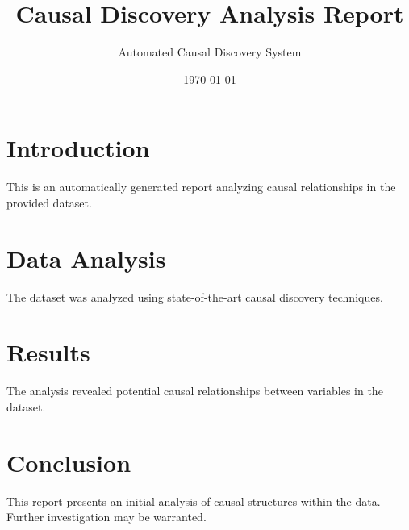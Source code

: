 \documentclass[10pt]{article}
\title{Causal Discovery Analysis Report}
\author{Automated Causal Discovery System}
\date{\today}
\begin{document}
\maketitle

\section{Introduction}
This is an automatically generated report analyzing causal relationships in the provided dataset.

\section{Data Analysis}
The dataset was analyzed using state-of-the-art causal discovery techniques.

\section{Results}
The analysis revealed potential causal relationships between variables in the dataset.

\section{Conclusion}
This report presents an initial analysis of causal structures within the data. Further investigation may be warranted.
\end{document}
